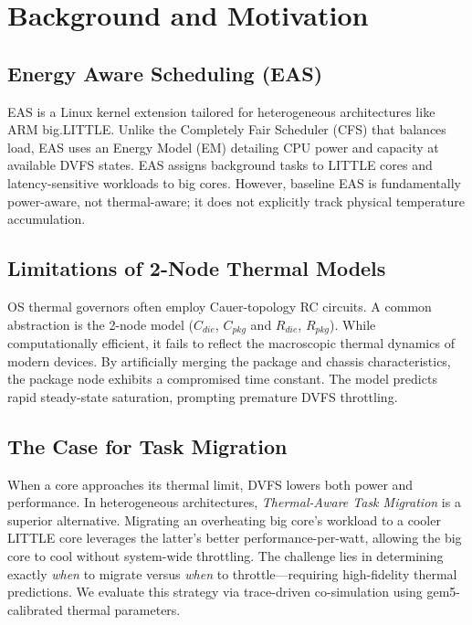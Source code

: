 \section{Background and Motivation}
\label{sec:background}

\subsection{Energy Aware Scheduling (EAS)}
EAS is a Linux kernel extension tailored for heterogeneous architectures like ARM big.LITTLE. Unlike the Completely Fair Scheduler (CFS) that balances load, EAS uses an Energy Model (EM) detailing CPU power and capacity at available DVFS states. EAS assigns background tasks to LITTLE cores and latency-sensitive workloads to big cores. However, baseline EAS is fundamentally power-aware, not thermal-aware; it does not explicitly track physical temperature accumulation.

\subsection{Limitations of 2-Node Thermal Models}
OS thermal governors often employ Cauer-topology RC circuits. A common abstraction is the 2-node model ($C_{die}$, $C_{pkg}$ and $R_{die}$, $R_{pkg}$). While computationally efficient, it fails to reflect the macroscopic thermal dynamics of modern devices. By artificially merging the package and chassis characteristics, the package node exhibits a compromised time constant. The model predicts rapid steady-state saturation, prompting premature DVFS throttling.

\subsection{The Case for Task Migration}
When a core approaches its thermal limit, DVFS lowers both power and performance. In heterogeneous architectures, \emph{Thermal-Aware Task Migration} is a superior alternative. Migrating an overheating big core's workload to a cooler LITTLE core leverages the latter's better performance-per-watt, allowing the big core to cool without system-wide throttling. The challenge lies in determining exactly \emph{when} to migrate versus \emph{when} to throttle---requiring high-fidelity thermal predictions. We evaluate this strategy via trace-driven co-simulation using gem5-calibrated thermal parameters.
